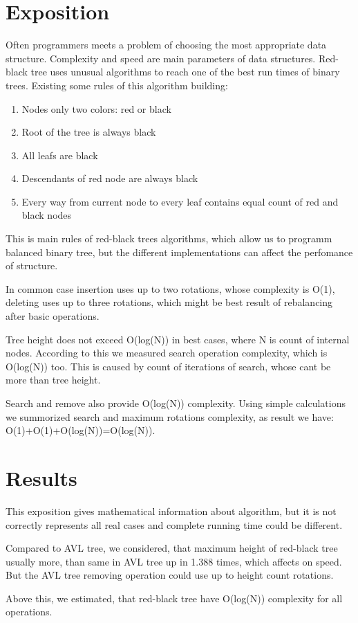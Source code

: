\documentclass[twoside,twocolumn]{article}
\begin{document}
\section{Exposition}
Often programmers meets a problem of choosing the most appropriate data structure. Complexity and speed are main parameters of data structures. Red-black tree uses unusual algorithms to reach one of the best run times of binary trees. Existing some rules of this algorithm building:
\begin{enumerate}
\item Nodes only two colors: red or black
\item Root of the tree is always black
\item All leafs are black
\item Descendants of red node are always black
\item Every way from current node to every leaf contains equal count of red and black nodes
\end{enumerate}
This is main rules of red-black trees algorithms, which allow us to programm balanced binary tree, but the different implementations can affect the perfomance of structure. 

In common case insertion uses up to two rotations, whose complexity is O(1), deleting uses up to three rotations, which might be best result of rebalancing after basic operations.

Tree height does not exceed O(log(N)) in best cases, where N is count of internal nodes. According to this we measured search operation complexity, which is O(log(N)) too. This is caused by count of iterations of search, whose cant be more than tree height.

Search and remove also provide O(log(N)) complexity. Using simple calculations we summorized search and maximum rotations complexity, as result we have: O(1)+O(1)+O(log(N))=O(log(N)).
\section{Results}
This exposition gives mathematical information about algorithm, but it is not correctly represents all real cases and complete running time could be different. 

Compared to AVL tree, we considered, that maximum height of red-black tree usually more, than same in AVL tree up in 1.388 times, which affects on speed. But the AVL tree removing operation could use up to height count rotations.

Above this, we estimated, that red-black tree have O(log(N)) complexity for all operations.
\end{document}
